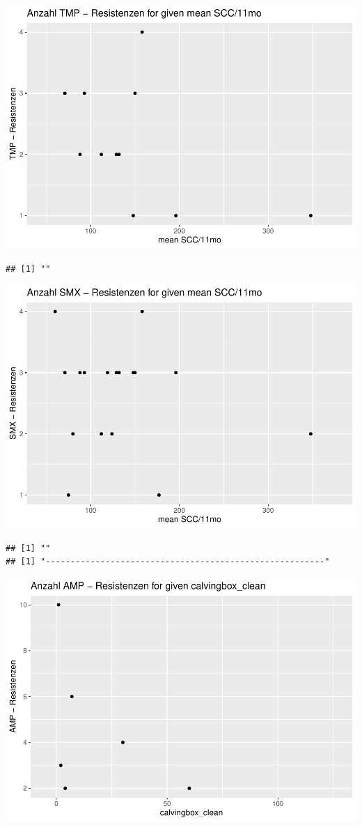 \documentclass[
]{article}
\begin{document}
\includegraphics{NResistenzen_files/figure-latex/numerical_variables-19.pdf}

\begin{verbatim}
## [1] ""
\end{verbatim}

\includegraphics{NResistenzen_files/figure-latex/numerical_variables-20.pdf}

\begin{verbatim}
## [1] ""
## [1] "--------------------------------------------------------"
\end{verbatim}

\includegraphics{NResistenzen_files/figure-latex/numerical_variables-21.pdf}
\end{document}
